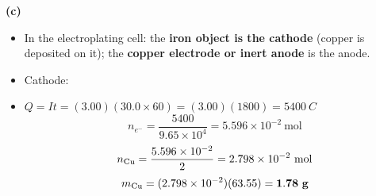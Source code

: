\documentclass[addpoints]{exam}
\begin{document}
\begin{questions}
\begin{solution}[10cm]
\textbf{(c)}
\begin{itemize}
    \item[(i)] In the electroplating cell: the \textbf{iron object is the cathode} (copper
    is deposited on it); the \textbf{copper electrode or inert anode} is the anode.
    \item[(ii)] Cathode: 
    \item[(iii)] $Q = It = (3.00)(30.0 \times 60) = (3.00)(1800) = \SI{5400}{C}$
    \[
    n_{e^-} = \frac{5400}{9.65\times10^4} = 5.596\times10^{-2}\ \text{mol}
    \]
    \[
    n_{\ce{Cu}} = \frac{5.596\times10^{-2}}{2} = 2.798\times10^{-2}\ \text{mol}
    \]
    \[
    m_{\ce{Cu}} = (2.798\times10^{-2})(63.55) = \mathbf{1.78\ g}
    \]
\end{itemize}
\end{solution}

\end{questions}
\end{document}
